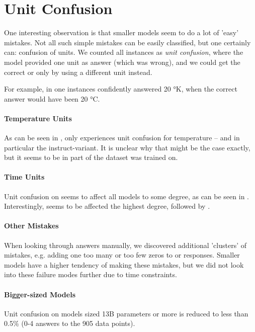 \section{Unit Confusion}\label{sec:unitconfusion}


One interesting observation is that smaller models seem to do a lot of 'easy' mistakes.
Not all such simple mistakes can be easily classified, but one certainly can: confusion of units.
We counted all instances as \textit{unit confusion}, where the model provided one unit as answer (which was wrong), and we could get the correct \ttemp or \ttime only by using a different unit instead.

For example, in one instances  confidently answered 20 °K, when the correct answer would have been 20 °C.

\paragraph{Temperature Units}
As can be seen in , only  experiences unit confusion for temperature -- and in particular the instruct-variant.
It is unclear why that might be the case exactly, but it seems to be in part of the dataset  was trained on.

\paragraph{Time Units}
Unit confusion on \ttime seems to affect all models to some degree, as can be seen in .
Interestingly,  seems to be affected the highest degree, followed by .

\paragraph{Other Mistakes}
When looking through answers manually, we discovered additional 'clusters' of mistakes, e.g. adding one too many or too few zeros to \ttime or \ttemp responses.
Smaller models have a higher tendency of making these mistakes, but we did not look into these failure modes further due to time constraints.

\paragraph{Bigger-sized Models}
Unit confusion on models sized 13B parameters or more is reduced to less than 0.5\% (0-4 answers to the 905 data points).

